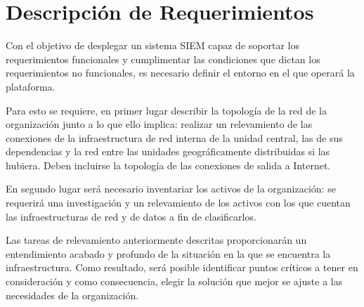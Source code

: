 \chapter{Descripción de Requerimientos}
    Con el objetivo de desplegar un sistema SIEM capaz de soportar los requerimientos funcionales y cumplimentar las condiciones que dictan los requerimientos no funcionales, es necesario definir el entorno en el que operará la plataforma. \par
    Para esto se requiere, en primer lugar describir la topología de la red de la organización junto a lo que ello implica: realizar un relevamiento de las conexiones  de la infraestructura de red interna de la unidad central, las de sus dependencias y la red entre las unidades geográficamente distribuidas si las hubiera. Deben incluirse la topología de las conexiones de salida a Internet. \par
    En segundo lugar será necesario inventariar los activos de la organización: se requerirá una investigación y un relevamiento de los activos con los que cuentan las infraestructuras de red y de datos a fin de clasificarlos. \par
    Las tareas de relevamiento anteriormente descritas proporcionarán un entendimiento acabado y profundo de la situación en la que se encuentra la infraestructura. Como resultado, será posible identificar puntos críticos a tener en consideración y como consecuencia, elegir la solución que mejor se ajuste a las necesidades de la organización. \par

